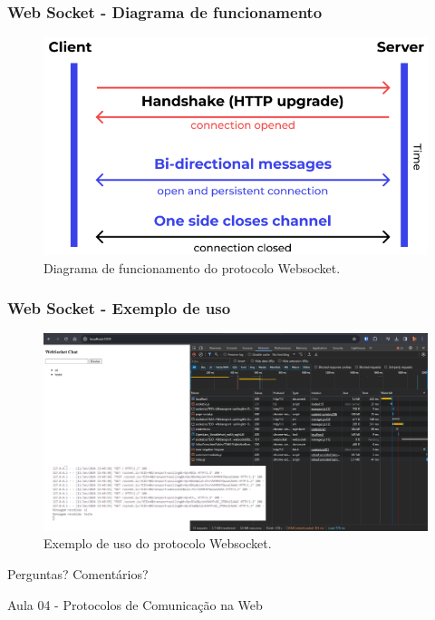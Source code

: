 \documentclass[
	10pt, %
	t, %
]{beamer}
\begin{document}
\begin{frame}
	\frametitle{Web Socket - Diagrama de funcionamento}

	\begin{figure}
		\centering
		\includegraphics[width=0.9\linewidth]{websocket.png}
		\caption{Diagrama de funcionamento do protocolo Websocket.}
		\label{fig:websocket}
	\end{figure}

\end{frame}

\begin{frame}
	\frametitle{Web Socket - Exemplo de uso}

	\begin{figure}
		\centering
		\includegraphics[width=0.9\linewidth]{websocket_example.png}
		\caption{Exemplo de uso do protocolo Websocket.}
		\label{fig:websocket_example}
	\end{figure}

\end{frame}

	


\begin{frame}[plain] %
	\begin{center}
		\bigskip\bigskip %
		
		{\Huge Perguntas? Comentários?}
		
		\bigskip\bigskip %
		
		{\LARGE Aula 04 - Protocolos de Comunicação na Web}
	\end{center}
\end{frame}

\end{document}
